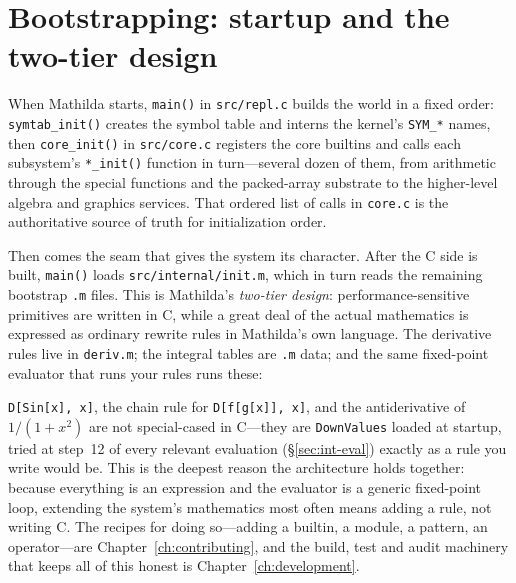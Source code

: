 \section{Bootstrapping: startup and the two-tier design}
\label{sec:int-boot}

When Mathilda starts, \texttt{main()} in \texttt{src/repl.c} builds the world in a
fixed order: \texttt{symtab\_init()} creates the symbol table and interns the kernel's
\texttt{SYM\_*} names, then \texttt{core\_init()} in \texttt{src/core.c} registers the
core builtins and calls each subsystem's \texttt{*\_init()} function in turn---several
dozen of them, from arithmetic through the special functions and the packed-array
substrate to the higher-level algebra and graphics services. That ordered list of calls
in \texttt{core.c} is the authoritative source of truth for initialization order.

Then comes the seam that gives the system its character. After the C side is built,
\texttt{main()} loads \texttt{src/internal/init.m}, which in turn reads the remaining
bootstrap \texttt{.m} files. This is Mathilda's \emph{two-tier design}:
performance-sensitive primitives are written in C, while a great deal of the actual
mathematics is expressed as ordinary rewrite rules in Mathilda's own language. The
derivative rules live in \texttt{deriv.m}; the integral tables are \texttt{.m} data;
and the same fixed-point evaluator that runs your rules runs these:


\texttt{D[Sin[x], x]}, the chain rule for \texttt{D[f[g[x]], x]}, and the
antiderivative of \(1/(1+x^2)\) are not special-cased in C---they are
\texttt{DownValues} loaded at startup, tried at step~12 of every relevant evaluation
(\S\ref{sec:int-eval}) exactly as a rule you write would be. This is the deepest
reason the architecture holds together: because everything is an expression and the
evaluator is a generic fixed-point loop, extending the system's mathematics most often
means adding a rule, not writing C. The recipes for doing so---adding a builtin, a
module, a pattern, an operator---are Chapter~\ref{ch:contributing}, and the build,
test and audit machinery that keeps all of this honest is
Chapter~\ref{ch:development}.
